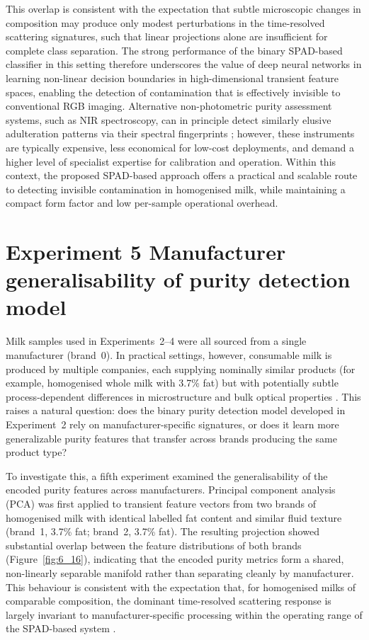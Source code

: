 \documentclass[12pt,a4paper,oneside]{report}
\let\oldsection\section
\renewcommand{\section}{\clearpage\oldsection}
\begin{document}
This overlap is consistent with the expectation that subtle microscopic changes in composition may produce only modest perturbations in the time-resolved scattering signatures, such that linear projections alone are insufficient for complete class separation. The strong performance of the binary SPAD-based classifier in this setting therefore underscores the value of deep neural networks in learning non-linear decision boundaries in high-dimensional transient feature spaces, enabling the detection of contamination that is effectively invisible to conventional RGB imaging. Alternative non-photometric purity assessment systems, such as NIR spectroscopy, can in principle detect similarly elusive adulteration patterns via their spectral fingerprints \cite{aernouts2015,joolaei2025}; however, these instruments are typically expensive, less economical for low-cost deployments, and demand a higher level of specialist expertise for calibration and operation. Within this context, the proposed SPAD-based approach offers a practical and scalable route to detecting invisible contamination in homogenised milk, while maintaining a compact form factor and low per-sample operational overhead.

\section{Experiment 5 Manufacturer generalisability of purity detection model}
\label{sec:experiment_5_chapter6}

Milk samples used in Experiments~2--4 were all sourced from a single manufacturer (brand~0). In practical settings, however, consumable milk is produced by multiple companies, each supplying nominally similar products (for example, homogenised whole milk with 3.7\% fat) but with potentially subtle process-dependent differences in microstructure and bulk optical properties \cite{walstra1999,aernouts2015}. This raises a natural question: does the binary purity detection model developed in Experiment~2 rely on manufacturer-specific signatures, or does it learn more generalizable purity features that transfer across brands producing the same product type?

To investigate this, a fifth experiment examined the generalisability of the encoded purity features across manufacturers. Principal component analysis (PCA) was first applied to transient feature vectors from two brands of homogenised milk with identical labelled fat content and similar fluid texture (brand~1, 3.7\% fat; brand~2, 3.7\% fat). The resulting projection showed substantial overlap between the feature distributions of both brands (Figure~\ref{fig:6_16}), indicating that the encoded purity metrics form a shared, non-linearly separable manifold rather than separating cleanly by manufacturer. This behaviour is consistent with the expectation that, for homogenised milks of comparable composition, the dominant time-resolved scattering response is largely invariant to manufacturer-specific processing within the operating range of the SPAD-based system \cite{nielsen2013}.
\end{document}
